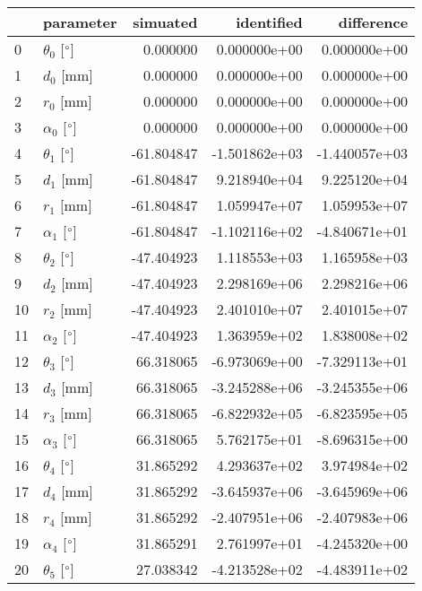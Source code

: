 \documentclass{standalone}%
\begin{document}
%
\normalsize%
\begin{tabular}{llrrr}
\toprule
{} &                 parameter &   simuated &    identified &    difference \\
\midrule
0  &  $\theta_{0}$ [$\degree$] &   0.000000 &  0.000000e+00 &  0.000000e+00 \\
1  &              $d_{0}$ [mm] &   0.000000 &  0.000000e+00 &  0.000000e+00 \\
2  &              $r_{0}$ [mm] &   0.000000 &  0.000000e+00 &  0.000000e+00 \\
3  &  $\alpha_{0}$ [$\degree$] &   0.000000 &  0.000000e+00 &  0.000000e+00 \\
4  &  $\theta_{1}$ [$\degree$] & -61.804847 & -1.501862e+03 & -1.440057e+03 \\
5  &              $d_{1}$ [mm] & -61.804847 &  9.218940e+04 &  9.225120e+04 \\
6  &              $r_{1}$ [mm] & -61.804847 &  1.059947e+07 &  1.059953e+07 \\
7  &  $\alpha_{1}$ [$\degree$] & -61.804847 & -1.102116e+02 & -4.840671e+01 \\
8  &  $\theta_{2}$ [$\degree$] & -47.404923 &  1.118553e+03 &  1.165958e+03 \\
9  &              $d_{2}$ [mm] & -47.404923 &  2.298169e+06 &  2.298216e+06 \\
10 &              $r_{2}$ [mm] & -47.404923 &  2.401010e+07 &  2.401015e+07 \\
11 &  $\alpha_{2}$ [$\degree$] & -47.404923 &  1.363959e+02 &  1.838008e+02 \\
12 &  $\theta_{3}$ [$\degree$] &  66.318065 & -6.973069e+00 & -7.329113e+01 \\
13 &              $d_{3}$ [mm] &  66.318065 & -3.245288e+06 & -3.245355e+06 \\
14 &              $r_{3}$ [mm] &  66.318065 & -6.822932e+05 & -6.823595e+05 \\
15 &  $\alpha_{3}$ [$\degree$] &  66.318065 &  5.762175e+01 & -8.696315e+00 \\
16 &  $\theta_{4}$ [$\degree$] &  31.865292 &  4.293637e+02 &  3.974984e+02 \\
17 &              $d_{4}$ [mm] &  31.865292 & -3.645937e+06 & -3.645969e+06 \\
18 &              $r_{4}$ [mm] &  31.865292 & -2.407951e+06 & -2.407983e+06 \\
19 &  $\alpha_{4}$ [$\degree$] &  31.865291 &  2.761997e+01 & -4.245320e+00 \\
20 &  $\theta_{5}$ [$\degree$] &  27.038342 & -4.213528e+02 & -4.483911e+02 \\

\end{tabular}
\end{document}

